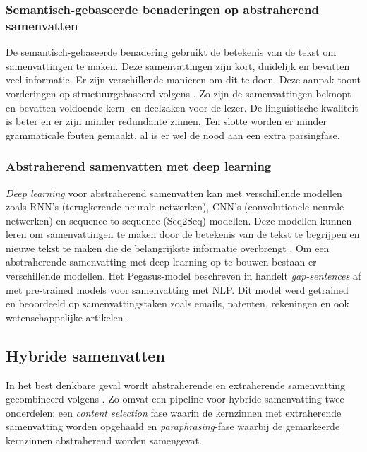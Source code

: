 \subsubsection{Semantisch-gebaseerde benaderingen op abstraherend samenvatten}

De semantisch-gebaseerde benadering gebruikt de betekenis van de tekst om samenvattingen te maken. Deze samenvattingen zijn kort, duidelijk en bevatten veel informatie. Er zijn verschillende manieren om dit te doen. Deze aanpak toont vorderingen op structuurgebaseerd volgens \textcite{Khan2014}. Zo zijn de samenvattingen beknopt en bevatten voldoende kern- en deelzaken voor de lezer. De linguïstische kwaliteit is beter en er zijn minder redundante zinnen. Ten slotte worden er minder grammaticale fouten gemaakt, al is er wel de nood aan een extra parsingfase.

\subsubsection{Abstraherend samenvatten met deep learning}

\textit{Deep learning} voor abstraherend samenvatten kan met verschillende modellen zoals RNN’s (terugkerende neurale netwerken), CNN’s (convolutionele neurale netwerken) en sequence-to-sequence (Seq2Seq) modellen. Deze modellen kunnen leren om samenvattingen te maken door de betekenis van de tekst te begrijpen en nieuwe tekst te maken die de belangrijkste informatie overbrengt \autocite{Suleiman2020}. Om een abstraherende samenvatting met deep learning op te bouwen bestaan er verschillende modellen. Het Pegasus-model beschreven in \textcite{Zhang2020} handelt \textit{gap-sentences} af met pre-trained models voor samenvatting met NLP.  Dit model werd getrained en beoordeeld op samenvattingstaken zoals emails, patenten, rekeningen en ook wetenschappelijke artikelen \autocite{Zhang2020}.

\subsection{Hybride samenvatten}

In het best denkbare geval wordt abstraherende en extraherende samenvatting gecombineerd volgens \textcite{Hsu2018, Huang2019}. Zo omvat een pipeline voor hybride samenvatting twee onderdelen: een \textit{content selection} fase waarin de kernzinnen met extraherende samenvatting worden opgehaald en \textit{paraphrasing}-fase waarbij de gemarkeerde kernzinnen abstraherend worden samengevat. 

